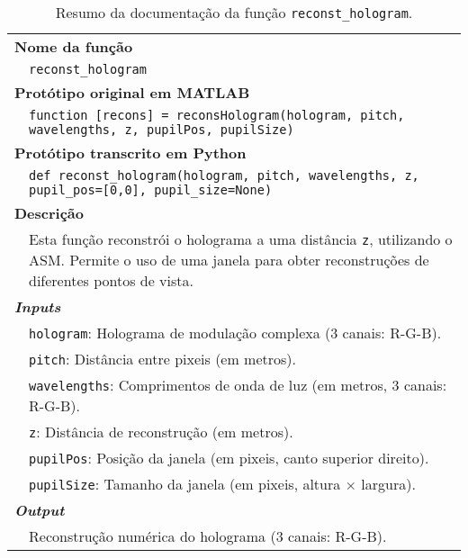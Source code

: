 \begin{table}[!htbp]
    \centering
    \caption{Resumo da documentação da função \texttt{reconst\_hologram}.}
    \label{tab:reconst_hologram}
    \begin{tabular}{p{1cm} p{10cm}}
        \hline
        \multicolumn{2}{l}{\bfseries Nome da função}\\
         & \verb|reconst_hologram|\\
        \hline
        \multicolumn{2}{l}{\bfseries Protótipo original em MATLAB}\\
         & \texttt{function [recons] = reconsHologram(hologram, pitch, wavelengths, z, pupilPos, pupilSize)
         }\\
        \hline
        \multicolumn{2}{l}{\bfseries Protótipo transcrito em Python}\\
         & \texttt{def reconst_hologram(hologram, pitch, wavelengths, z, pupil_pos=[0,0], pupil_size=None)} \\
        \hline\multicolumn{2}{l}{\bfseries Descrição}\\
         & Esta função reconstrói o holograma a uma distância \verb|z|, utilizando o \ac{ASM}. Permite o uso de uma janela para obter reconstruções de diferentes pontos de vista.\\
        \hline\multicolumn{2}{l}{\bfseries \textit{Inputs}}\\
         & \verb|hologram|: Holograma de modulação complexa (3 canais: R-G-B). \\
         & \verb|pitch|: Distância entre pixeis (em metros).\\
         & \verb|wavelengths|: Comprimentos de onda de luz (em metros, 3 canais: R-G-B).\\
         & \verb|z|: Distância de reconstrução (em metros).\\
         & \verb|pupilPos|: Posição da janela (em pixeis, canto superior direito).\\
         & \verb|pupilSize|: Tamanho da janela (em pixeis, altura $\times$ largura).\\
        \hline\multicolumn{2}{l}{\bfseries \textit{Output}}\\
         & Reconstrução numérica do holograma (3 canais: R-G-B).\\
        \hline
    \end{tabular}
\end{table}



